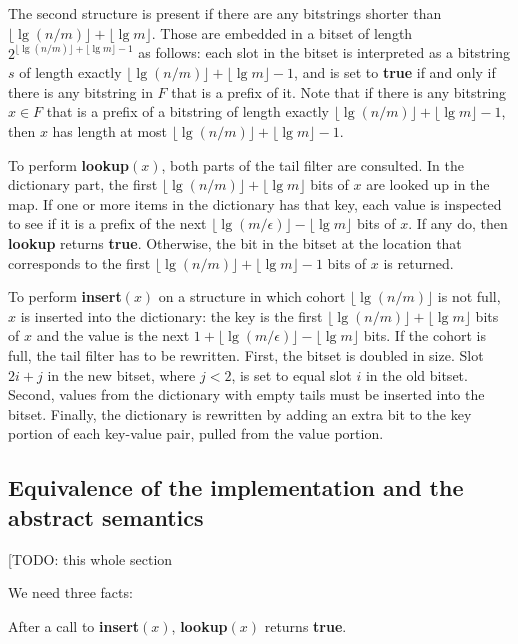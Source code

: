 \documentclass[11pt,letterpaper]{article}
\begin{document}
The second structure is present if there are any bitstrings shorter than $\lfloor \lg (n/m) \rfloor + \lfloor \lg m \rfloor$.
Those are embedded in a bitset of length $2^{\lfloor \lg (n/m) \rfloor + \lfloor \lg m \rfloor - 1}$ as follows:
each slot in the bitset is interpreted as a bitstring $s$ of length exactly $\lfloor \lg (n/m) \rfloor + \lfloor \lg m \rfloor - 1$, and is set to {\bf true} if and only if there is any bitstring in $F$ that is a prefix of it.
Note that if there is any bitstring $x \in F$ that is a prefix of a bitstring of length exactly $\lfloor \lg (n/m) \rfloor + \lfloor \lg m \rfloor - 1$, then $x$ has length at most $\lfloor \lg (n/m) \rfloor + \lfloor \lg m \rfloor - 1$.

To perform {\bf lookup$(x)$}, both parts of the tail filter are consulted.
In the dictionary part, the first $\lfloor \lg (n/m) \rfloor + \lfloor \lg m \rfloor$ bits of $x$ are looked up in the map.
If one or more items in the dictionary has that key, each value is inspected to see if it is a prefix of the next $\lfloor \lg(m/\epsilon) \rfloor - \lfloor \lg m \rfloor$ bits of $x$.
If any do, then {\bf lookup} returns {\bf true}.
Otherwise, the bit in the bitset at the location that corresponds to the first $\lfloor \lg (n/m) \rfloor + \lfloor \lg m \rfloor - 1$ bits of $x$ is returned.

To perform {\bf insert$(x)$} on a structure in which cohort $\lfloor \lg (n/m) \rfloor$ is not full, $x$ is inserted into the dictionary: the key is the first $\lfloor \lg (n/m) \rfloor + \lfloor \lg m \rfloor$ bits of $x$ and the value is the next $1 + \lfloor \lg (m/\epsilon) \rfloor - \lfloor \lg m \rfloor$ bits.
If the cohort is full, the tail filter has to be rewritten.
First, the bitset is doubled in size.
Slot $2i + j$ in the new bitset, where $j < 2$, is set to equal slot $i$ in the old bitset.
Second, values from the dictionary with empty tails must be inserted into the bitset.
Finally, the dictionary is rewritten by adding an extra bit to the key portion of each key-value pair, pulled from the value portion.

\subsection{Equivalence of the implementation and the abstract semantics}

[TODO: this whole section
  
We need three facts:

After a call to {\bf insert$(x)$}, {\bf lookup$(x)$} returns {\bf true}.
\end{document}
